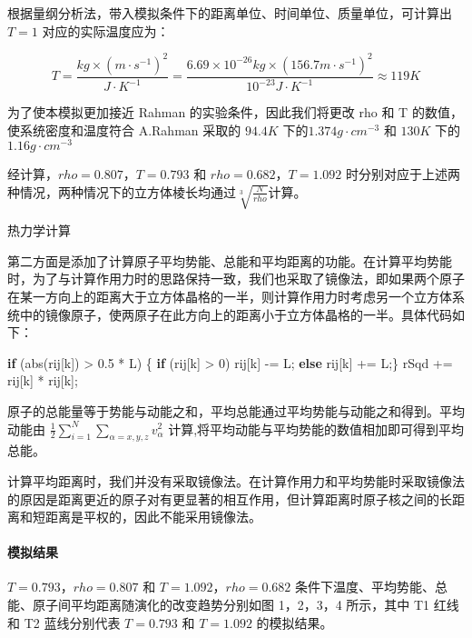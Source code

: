 \documentclass[
]{article}
\newenvironment{Shaded}{}{}
\newcommand{\ControlFlowTok}[1]{\textcolor[rgb]{0.00,0.44,0.13}{\textbf{#1}}}
\newcommand{\DecValTok}[1]{\textcolor[rgb]{0.25,0.63,0.44}{#1}}
\newcommand{\FloatTok}[1]{\textcolor[rgb]{0.25,0.63,0.44}{#1}}
\newcommand{\NormalTok}[1]{#1}
\begin{document}
根据量纲分析法，带入模拟条件下的距离单位、时间单位、质量单位，可计算出
\(T=1\) 对应的实际温度应为：

\[T=\frac{kg\times(m·s^{-1})^2}{ J·K^{-1} } =\frac{6.69\times 10^{-26}kg \times (156.7 m·s^{-1})^2}{10^{-23}J·K^{-1}} \approx 119K\]

为了使本模拟更加接近 Rahman 的实验条件，因此我们将更改 rho 和 T
的数值，使系统密度和温度符合 A.Rahman 采取的 \(94.4K\)
下的\(1.374g·cm^{-3}\) 和 \(130K\) 下的\(1.16g·cm^{-3}\)

经计算，\(rho = 0.807，T = 0.793\) 和 \(rho=0.682，T=1.092 \)
时分别对应于上述两种情况，两种情况下的立方体棱长均通过\(\sqrt[3]{\frac{N}{rho}}\)计算。

热力学计算

第二方面是添加了计算原子平均势能、总能和平均距离的功能。在计算平均势能时，为了与计算作用力时的思路保持一致，我们也采取了镜像法，即如果两个原子在某一方向上的距离大于立方体晶格的一半，则计算作用力时考虑另一个立方体系统中的镜像原子，使两原子在此方向上的距离小于立方体晶格的一半。具体代码如下：

\begin{Shaded}
\begin{Highlighting}[]
                \ControlFlowTok{if}\NormalTok{ (abs(rij[k]) \textgreater{} }\FloatTok{0.5}\NormalTok{ * L) \{}
                    \ControlFlowTok{if}\NormalTok{ (rij[k] \textgreater{} }\DecValTok{0}\NormalTok{)}
\NormalTok{                        rij[k] {-}= L;}
                    \ControlFlowTok{else}
\NormalTok{                        rij[k] += L;\}}
\NormalTok{                rSqd += rij[k] * rij[k];}
\end{Highlighting}
\end{Shaded}

原子的总能量等于势能与动能之和，平均总能通过平均势能与动能之和得到。平均动能由
\(\frac{1}{2}\)\(\sum_{i=1}^{N}\sum_{\alpha=x,y,z}v_{\alpha}^2\)
计算,将平均动能与平均势能的数值相加即可得到平均总能。

计算平均距离时，我们并没有采取镜像法。在计算作用力和平均势能时采取镜像法的原因是距离更近的原子对有更显著的相互作用，但计算距离时原子核之间的长距离和短距离是平权的，因此不能采用镜像法。

\hypertarget{header-n25}{%
\paragraph{模拟结果}\label{header-n25}}

\(T=0.793，rho=0.807\) 和 \(T=1.092，rho=0.682\)
条件下温度、平均势能、总能、原子间平均距离随演化的改变趋势分别如图
1，2，3，4 所示，其中 T1 红线和 T2 蓝线分别代表 \(T=0.793\) 和
\(T=1.092\) 的模拟结果。
\end{document}
